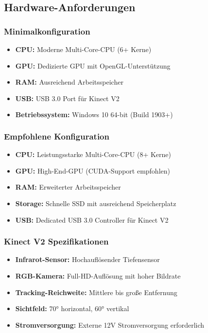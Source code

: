 \subsection{Hardware-Anforderungen}

\subsubsection{Minimalkonfiguration}
\begin{itemize}
    \item \textbf{CPU:} Moderne Multi-Core-CPU (6+ Kerne)
    \item \textbf{GPU:} Dedizierte GPU mit OpenGL-Unterstützung
    \item \textbf{RAM:} Ausreichend Arbeitsspeicher
    \item \textbf{USB:} USB 3.0 Port für Kinect V2
    \item \textbf{Betriebssystem:} Windows 10 64-bit (Build 1903+)
\end{itemize}

\subsubsection{Empfohlene Konfiguration}
\begin{itemize}
    \item \textbf{CPU:} Leistungsstarke Multi-Core-CPU (8+ Kerne)
    \item \textbf{GPU:} High-End-GPU (CUDA-Support empfohlen)
    \item \textbf{RAM:} Erweiterter Arbeitsspeicher
    \item \textbf{Storage:} Schnelle SSD mit ausreichend Speicherplatz
    \item \textbf{USB:} Dedicated USB 3.0 Controller für Kinect V2
\end{itemize}

\subsubsection{Kinect V2 Spezifikationen}
\begin{itemize}
    \item \textbf{Infrarot-Sensor:} Hochauflösender Tiefensensor
    \item \textbf{RGB-Kamera:} Full-HD-Auflösung mit hoher Bildrate
    \item \textbf{Tracking-Reichweite:} Mittlere bis große Entfernung
    \item \textbf{Sichtfeld:} 70° horizontal, 60° vertikal
    \item \textbf{Stromversorgung:} Externe 12V Stromversorgung erforderlich
\end{itemize}


